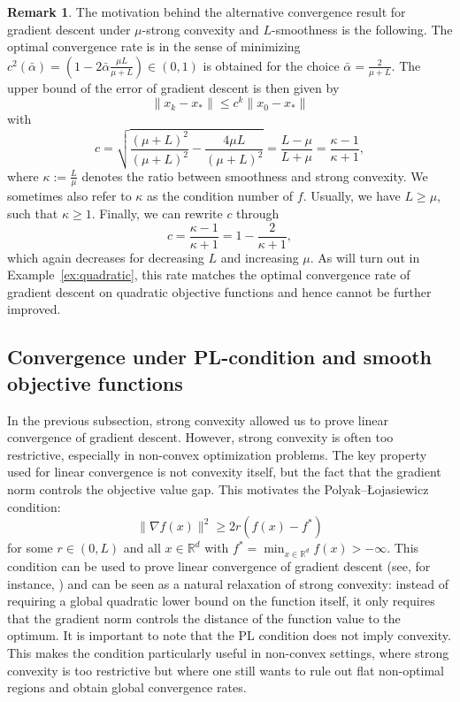 \documentclass[12pt,openany]{book}
\theoremstyle{definition}
\newtheorem{remark}[thm]{Remark}
\theoremstyle{definition}
\newcommand{\R}{\mathbb{R}}
\begin{document}
\begin{remark}\label{rem:opt_step}
The motivation behind the alternative convergence result for gradient descent under $\mu$-strong convexity and $L$-smoothness is the following. The optimal convergence rate is in the sense of minimizing $c^2(\bar\alpha)=(1-2\bar\alpha \frac{\mu L}{\mu+L}) \in(0,1)$ is obtained for the choice $\bar\alpha = \frac{2}{\mu+L}$. The upper bound of the error of gradient descent is then given by
\[\|x_k-x_\ast\| \le c^{k} \|x_0-x_\ast\| \]
with 
\[c = \sqrt{\frac{(\mu+L)^2}{(\mu+L)^2} - \frac{4\mu L}{(\mu+L)^2}} = \frac{L-\mu}{L+\mu} = \frac{\kappa-1}{\kappa+1}, \]
where $\kappa:= \frac{L}{\mu}$ denotes the ratio between smoothness and strong convexity. We sometimes also refer to $\kappa$ as the condition number of $f$. Usually, we have $L\ge\mu$,  such that $\kappa\ge1$. Finally, we can rewrite $c$ through
\[c = \frac{\kappa-1}{\kappa+1} = 1-\frac{2}{\kappa+1}, \]
which again decreases for decreasing $L$ and increasing $\mu$. As will turn out in Example~\ref{ex:quadratic}, this rate matches the optimal convergence rate of gradient descent on quadratic objective functions and hence cannot be further improved. 
\end{remark}


\subsection{Convergence under PL-condition and smooth objective functions}
In the previous subsection, strong convexity allowed us to prove linear convergence of gradient descent. However, strong convexity is often too restrictive, especially in non-convex optimization problems. The key property used for linear convergence is not convexity itself, but the fact that
the gradient norm controls the objective value gap. This motivates the Polyak--{\L}ojasiewicz condition:
\begin{equation}\label{eq:PL}
\|\nabla f(x)\|^2 \ge 2r (f(x)-f^\ast)
\end{equation}
for some $r\in(0,L)$ and all $x\in\R^d$ with $f^\ast = \min_{x\in\R^d} f(x)>-\infty$. This condition can be used to prove linear convergence of gradient descent (see, for instance, \cite{10.1007/978-3-319-46128-1_50}) and can be seen as a natural relaxation of strong convexity: instead of requiring a
global quadratic lower bound on the function itself, it only requires that the gradient norm controls
the distance of the function value to the optimum. It is important to note that the PL condition does not imply convexity. This makes the condition particularly useful in
non-convex settings, where strong convexity is too restrictive but where one still wants to rule out
flat non-optimal regions and obtain global convergence rates. 
\end{document}
